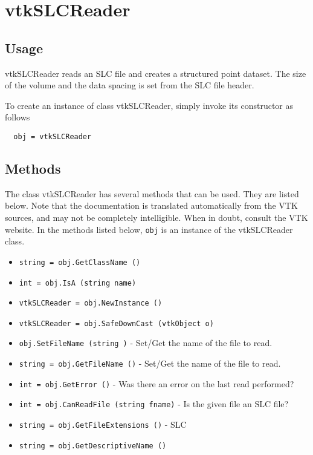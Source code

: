 \section{vtkSLCReader}

\subsection{Usage}

 vtkSLCReader reads an SLC file and creates a structured point dataset.
 The size of the volume and the data spacing is set from the SLC file
 header.

To create an instance of class vtkSLCReader, simply
invoke its constructor as follows
\begin{verbatim}
  obj = vtkSLCReader
\end{verbatim}
\subsection{Methods}

The class vtkSLCReader has several methods that can be used.
  They are listed below.
Note that the documentation is translated automatically from the VTK sources,
and may not be completely intelligible.  When in doubt, consult the VTK website.
In the methods listed below, \verb|obj| is an instance of the vtkSLCReader class.
\begin{itemize}
\item  \verb|string = obj.GetClassName ()|

\item  \verb|int = obj.IsA (string name)|

\item  \verb|vtkSLCReader = obj.NewInstance ()|

\item  \verb|vtkSLCReader = obj.SafeDownCast (vtkObject o)|

\item  \verb|obj.SetFileName (string )| -  Set/Get the name of the file to read.

\item  \verb|string = obj.GetFileName ()| -  Set/Get the name of the file to read.

\item  \verb|int = obj.GetError ()| -  Was there an error on the last read performed?

\item  \verb|int = obj.CanReadFile (string fname)| -  Is the given file an SLC file?

\item  \verb|string = obj.GetFileExtensions ()| -  SLC 

\item  \verb|string = obj.GetDescriptiveName ()|

\end{itemize}

